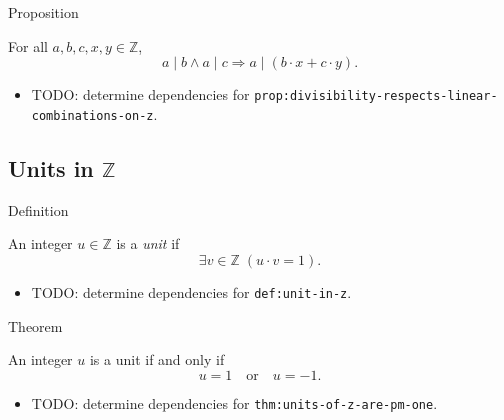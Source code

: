 \begin{propositionbox}{Proposition}
\begin{proposition}
\label{prop:divisibility-respects-linear-combinations-on-z}
For all $a,b,c,x,y\in\mathbb{Z}$,
\[
a\mid b\land a\mid c \Longrightarrow a\mid(b\cdot x+c\cdot y).
\]
\end{proposition}
\end{propositionbox}

\begin{dependencies}
\begin{itemize}
  \item TODO: determine dependencies for \texttt{prop:divisibility-respects-linear-combinations-on-z}.
\end{itemize}
\end{dependencies}

\subsection*{Units in $\mathbb{Z}$}

\begin{definitionbox}{Definition}
\begin{definition}
\label{def:unit-in-z}
An integer $u\in\mathbb{Z}$ is a \emph{unit} if
\[
\exists v\in\mathbb{Z}\;(u\cdot v=1).
\]
\end{definition}
\end{definitionbox}

\begin{dependencies}
\begin{itemize}
  \item TODO: determine dependencies for \texttt{def:unit-in-z}.
\end{itemize}
\end{dependencies}

\begin{theorembox}{Theorem}
\begin{theorem}
\label{thm:units-of-z-are-pm-one}
An integer $u$ is a unit if and only if
\[
u=1\quad\text{or}\quad u=-1.
\]
\end{theorem}
\end{theorembox}

\begin{dependencies}
\begin{itemize}
  \item TODO: determine dependencies for \texttt{thm:units-of-z-are-pm-one}.
\end{itemize}
\end{dependencies}

